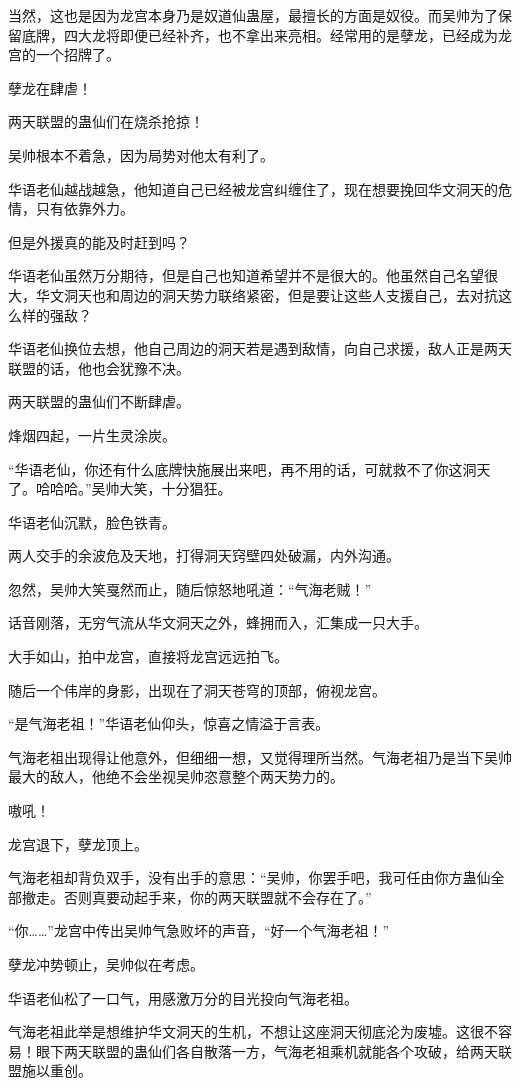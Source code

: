 \begin{this_body}
当然，这也是因为龙宫本身乃是奴道仙蛊屋，最擅长的方面是奴役。而吴帅为了保留底牌，四大龙将即便已经补齐，也不拿出来亮相。经常用的是孽龙，已经成为龙宫的一个招牌了。

孽龙在肆虐！

两天联盟的蛊仙们在烧杀抢掠！

吴帅根本不着急，因为局势对他太有利了。

华语老仙越战越急，他知道自己已经被龙宫纠缠住了，现在想要挽回华文洞天的危情，只有依靠外力。

但是外援真的能及时赶到吗？

华语老仙虽然万分期待，但是自己也知道希望并不是很大的。他虽然自己名望很大，华文洞天也和周边的洞天势力联络紧密，但是要让这些人支援自己，去对抗这么样的强敌？

华语老仙换位去想，他自己周边的洞天若是遇到敌情，向自己求援，敌人正是两天联盟的话，他也会犹豫不决。

两天联盟的蛊仙们不断肆虐。

烽烟四起，一片生灵涂炭。

“华语老仙，你还有什么底牌快施展出来吧，再不用的话，可就救不了你这洞天了。哈哈哈。”吴帅大笑，十分猖狂。

华语老仙沉默，脸色铁青。

两人交手的余波危及天地，打得洞天窍壁四处破漏，内外沟通。

忽然，吴帅大笑戛然而止，随后惊怒地吼道：“气海老贼！”

话音刚落，无穷气流从华文洞天之外，蜂拥而入，汇集成一只大手。

大手如山，拍中龙宫，直接将龙宫远远拍飞。

随后一个伟岸的身影，出现在了洞天苍穹的顶部，俯视龙宫。

“是气海老祖！”华语老仙仰头，惊喜之情溢于言表。

气海老祖出现得让他意外，但细细一想，又觉得理所当然。气海老祖乃是当下吴帅最大的敌人，他绝不会坐视吴帅恣意整个两天势力的。

嗷吼！

龙宫退下，孽龙顶上。

气海老祖却背负双手，没有出手的意思：“吴帅，你罢手吧，我可任由你方蛊仙全部撤走。否则真要动起手来，你的两天联盟就不会存在了。”

“你……”龙宫中传出吴帅气急败坏的声音，“好一个气海老祖！”

孽龙冲势顿止，吴帅似在考虑。

华语老仙松了一口气，用感激万分的目光投向气海老祖。

气海老祖此举是想维护华文洞天的生机，不想让这座洞天彻底沦为废墟。这很不容易！眼下两天联盟的蛊仙们各自散落一方，气海老祖乘机就能各个攻破，给两天联盟施以重创。


\end{this_body}
